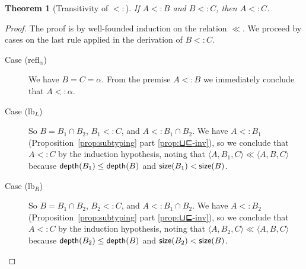 \documentclass{article}
\newtheorem{theorem}{Theorem}
\begin{document}
\begin{theorem}[Transitivity of $<:$]\label{thm:⊑-trans}
    If $A <: B$ and $B <: C$, then $A <: C$.
\end{theorem}
\begin{proof}
  The proof is by well-founded induction on the relation $\ll$.
  We proceed by cases on the last rule applied in the
  derivation of $B <: C$.
  \begin{description}
  \item[Case (refl$_\alpha$)] We have $B = C = \alpha$.  From the premise $A <:
    B$ we immediately conclude that $A <: \alpha$.
  \item[Case (lb$_L$)] So $B = B_1 \cap B_2$, $B_1 <: C$, and $A <: B_1 \cap
    B_2$.  We have $A <: B_1$ (Proposition~\ref{prop:subtyping} part
    \ref{prop:⊔⊑-inv}), so we conclude that $A <: C$ by the induction
    hypothesis, noting that $\langle A, B_1, C \rangle \ll \langle A,
    B, C \rangle$
    because $\mathsf{depth}(B_1) \le \mathsf{depth}(B)$
    and $\mathsf{size}(B_1) < \mathsf{size}(B)$.
  \item[Case (lb$_R$)] So $B = B_1 \cap B_2$, $B_2 <: C$, and $A <:
    B_1 \cap B_2$.  We have $A <: B_2$
    (Proposition~\ref{prop:subtyping} part \ref{prop:⊔⊑-inv}), so we
    conclude that $A <: C$ by the induction hypothesis, noting that
    $\langle A, B_2, C \rangle \ll \langle A, B, C \rangle$ because
    $\mathsf{depth}(B_2) \leq \mathsf{depth}(B)$ and $\mathsf{size}(B_2) < \mathsf{size}(B)$.
    

\end{description}
\end{proof}
\end{document}
